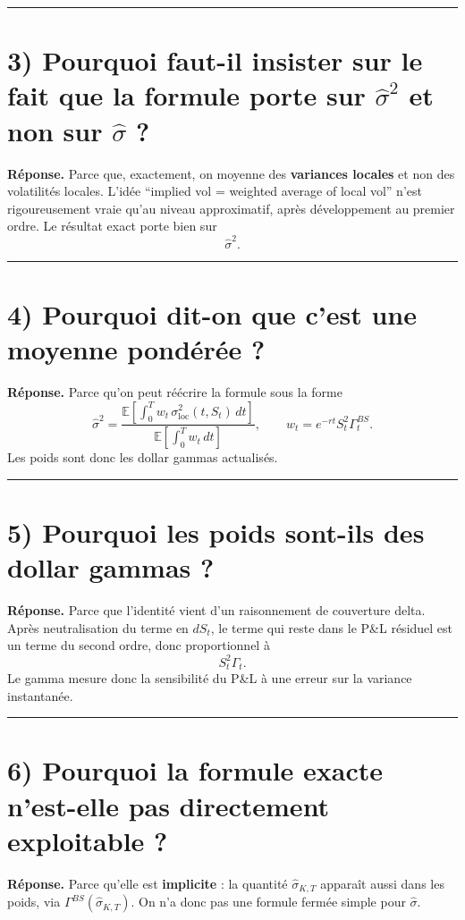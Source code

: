 \documentclass[11pt,a4paper]{article}
\begin{document}
\bigskip\hrule\bigskip

\section{3) Pourquoi faut-il insister sur le fait que la formule porte sur \(\hat\sigma^2\) et non sur \(\hat\sigma\) ?}

\textbf{Réponse.}  
Parce que, exactement, on moyenne des \textbf{variances locales} et non des volatilités locales.  
L’idée “implied vol = weighted average of local vol” n’est rigoureusement vraie qu’au niveau approximatif, après développement au premier ordre.  
Le résultat exact porte bien sur
\[
\hat\sigma^2.
\]

\bigskip\hrule\bigskip

\section{4) Pourquoi dit-on que c’est une moyenne pondérée ?}

\textbf{Réponse.}  
Parce qu’on peut réécrire la formule sous la forme
\[
\hat\sigma^2=\frac{\mathbb E[\int_0^T w_t\,\sigma_{\mathrm{loc}}^2(t,S_t)\,dt]}
{\mathbb E[\int_0^T w_t\,dt]},
\qquad
w_t=e^{-rt}S_t^2\Gamma_t^{BS}.
\]
Les poids sont donc les dollar gammas actualisés.

\bigskip\hrule\bigskip

\section{5) Pourquoi les poids sont-ils des dollar gammas ?}

\textbf{Réponse.}  
Parce que l’identité vient d’un raisonnement de couverture delta. Après neutralisation du terme en \(dS_t\), le terme qui reste dans le P\&{}L résiduel est un terme du second ordre, donc proportionnel à
\[
S_t^2\Gamma_t.
\]
Le gamma mesure donc la sensibilité du P\&{}L à une erreur sur la variance instantanée.

\bigskip\hrule\bigskip

\section{6) Pourquoi la formule exacte n’est-elle pas directement exploitable ?}

\textbf{Réponse.}  
Parce qu’elle est \textbf{implicite} : la quantité \(\hat\sigma_{K,T}\) apparaît aussi dans les poids, via \(\Gamma^{BS}(\hat\sigma_{K,T})\).  
On n’a donc pas une formule fermée simple pour \(\hat\sigma\).
\end{document}
